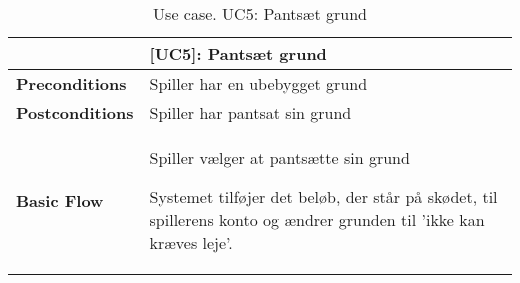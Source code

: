 \documentclass[class=article, crop=false]{standalone}
\begin{document}
    \begin{table}[H]
        \caption{Use case. UC5: Pantsæt grund}
        \begin{tabularx}{\textwidth}{|l|X|}
            \hline
            & \textbf{[UC5]: Pantsæt grund}   \\ \hline
            \textbf{Preconditions}       & Spiller har en ubebygget grund\\ \hline
            \textbf{Postconditions}      & Spiller har pantsat sin grund\\ \hline


            \textbf{Basic Flow} & \begin{tabenum}
                                      \item Spiller vælger at pantsætte sin grund
                                      \item Systemet tilføjer det beløb, der står på skødet, til spillerens konto og ændrer grunden til 'ikke kan kræves leje'.
            \end{tabenum}   \\ \hline



        \end{tabularx}


    \end{table}
\end{document}
